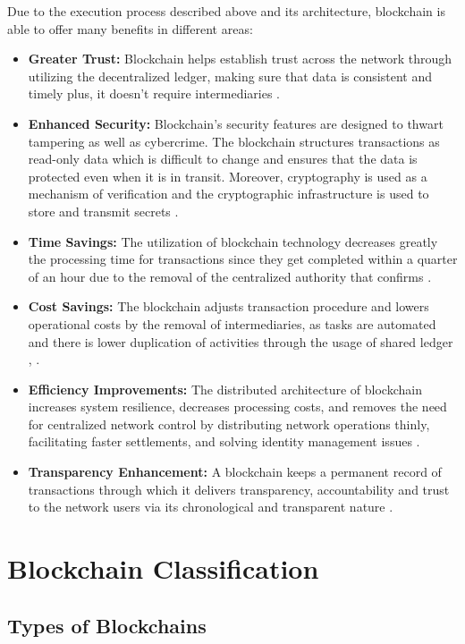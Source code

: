 Due to the execution process described above and its architecture, blockchain is able to offer many benefits in different areas:

\begin{itemize}
  \item \textbf{Greater Trust:} Blockchain helps establish trust across the network through utilizing the decentralized ledger, making sure that data is consistent and 
  timely plus, it doesn’t require intermediaries \cite{9596538}. 
  \item \textbf{Enhanced Security:} Blockchain's security features are designed to thwart tampering as well as cybercrime. The blockchain structures transactions as 
  read-only data which is difficult to change and ensures that the data is protected even when it is in transit. Moreover, cryptography is used as a mechanism of 
  verification and the cryptographic infrastructure is used to store and transmit secrets \cite{ibm_blockchain}.
  \item \textbf{Time Savings:} The utilization of blockchain technology decreases greatly the processing time for transactions since they get completed within a quarter of 
  an hour due to the removal of the centralized authority that confirms \cite{ibm_blockchain}.
  \item \textbf{Cost Savings:} The blockchain adjusts transaction procedure and lowers operational costs by the removal of intermediaries, as tasks are automated and there 
  is lower duplication of activities through the usage of shared ledger \cite{9596538}, \cite{9036241}.
  \item \textbf{Efficiency Improvements:} The distributed architecture of blockchain increases system resilience, decreases processing costs, and removes the need for 
  centralized network control by distributing network operations thinly, facilitating faster settlements, and solving identity management issues \cite{9036241}.
  \item \textbf{Transparency Enhancement:} A blockchain keeps a permanent record of transactions through which it delivers transparency, accountability and trust to the 
  network users via its chronological and transparent nature \cite{9036241}.
\end{itemize}

\section{Blockchain Classification}

\subsection{Types of Blockchains}

